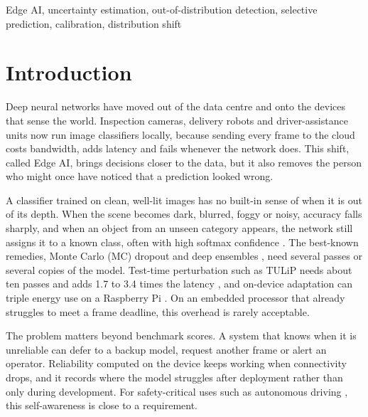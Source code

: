 \documentclass[conference]{IEEEtran}
\begin{document}
\begin{IEEEkeywords}
Edge AI, uncertainty estimation, out-of-distribution detection, selective prediction, calibration, distribution shift
\end{IEEEkeywords}

\section{Introduction}

Deep neural networks have moved out of the data centre and onto the devices that sense the world. Inspection cameras, delivery robots and driver-assistance units now run image classifiers locally, because sending every frame to the cloud costs bandwidth, adds latency and fails whenever the network does. This shift, called Edge AI, brings decisions closer to the data, but it also removes the person who might once have noticed that a prediction looked wrong.

A classifier trained on clean, well-lit images has no built-in sense of when it is out of its depth. When the scene becomes dark, blurred, foggy or noisy, accuracy falls sharply, and when an object from an unseen category appears, the network still assigns it to a known class, often with high softmax confidence \cite{hendrycks2017baseline,ovadia2019trust}. The best-known remedies, Monte Carlo (MC) dropout \cite{gal2016dropout} and deep ensembles \cite{lakshminarayanan2017ensembles}, need several passes or several copies of the model. Test-time perturbation such as TULiP needs about ten passes and adds 1.7 to 3.4 times the latency \cite{zhang2025tulip}, and on-device adaptation can triple energy use on a Raspberry Pi \cite{danilowski2026botta}. On an embedded processor that already struggles to meet a frame deadline, this overhead is rarely acceptable.

The problem matters beyond benchmark scores. A system that knows when it is unreliable can defer to a backup model, request another frame or alert an operator. Reliability computed on the device keeps working when connectivity drops, and it records where the model struggles after deployment rather than only during development. For safety-critical uses such as autonomous driving \cite{shao2023failure,rahmani2026edgecase}, this self-awareness is close to a requirement.
\end{document}
